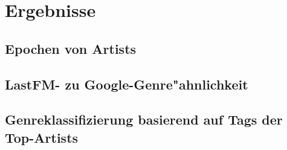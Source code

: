 \section{Ergebnisse}
\subsection{Epochen von Artists}

\subsection{LastFM- zu Google-Genre"ahnlichkeit}

\subsection{Genreklassifizierung basierend auf Tags der Top-Artists}
